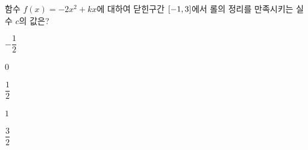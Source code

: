 함수 $f(x)=-2x^2+kx$에 대하여 닫힌구간 $[-1{,}\mkern3mu\mathopen{}3]$에서 롤의 정리를 만족시키는 실수 $c$의 값은? 
\begin{choices32}{\rule[-3ex]{0pt}{8ex}$-\dfrac{1}{2}$}{\rule[-3ex]{0pt}{8ex}$0$}{\rule[-3ex]{0pt}{8ex}$\dfrac{1}{2}$}{\rule[-3ex]{0pt}{8ex}$1$}{\rule[-3ex]{0pt}{8ex}$\dfrac{3}{2}$}\end{choices32}
